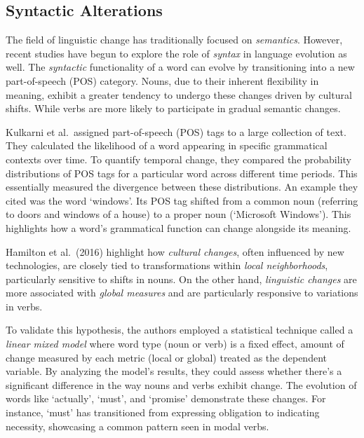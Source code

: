 \subsection{Syntactic Alterations} \label{subsec:syntactic-alterations}
The field of linguistic change has traditionally focused on \emph{semantics}.
However, recent studies have begun to explore the role of \emph{syntax} in language evolution as well.
The \emph{syntactic} functionality of a word can evolve by transitioning into a new part-of-speech (POS) category.
Nouns, due to their inherent flexibility in meaning, exhibit a greater tendency to undergo these changes driven by cultural shifts.
While verbs are more likely to participate in gradual semantic changes. \cite{hamilton-etal-2016-cultural, hamilton-etal-2016-diachronic}

Kulkarni et al.\ assigned part-of-speech (POS) tags to a large collection of text.
They calculated the likelihood of a word appearing in specific grammatical contexts over time.
To quantify temporal change, they compared the probability distributions of POS tags for a particular word across different time periods.
This essentially measured the divergence between these distributions.
An example they cited was the word `windows'.
Its POS tag shifted from a common noun (referring to doors and windows of a house) to a proper noun (`Microsoft Windows').
This highlights how a word's grammatical function can change alongside its meaning.

Hamilton et al.\ (2016) highlight how \emph{cultural changes}, often influenced by new technologies, are closely tied to transformations within \emph{local neighborhoods}, particularly sensitive to shifts in nouns.
On the other hand, \emph{linguistic changes} are more associated with \emph{global measures} and are particularly responsive to variations in verbs.

To validate this hypothesis, the authors employed a statistical technique called a \emph{linear mixed model} where word type (noun or verb) is a fixed effect,
amount of change measured by each metric (local or global) treated as the dependent variable.
By analyzing the model's results, they could assess whether there's a significant difference in the way nouns and verbs exhibit change.
The evolution of words like `actually', `must', and `promise' demonstrate these changes.
For instance, `must' has transitioned from expressing obligation to indicating necessity, showcasing a common pattern seen in modal verbs.

